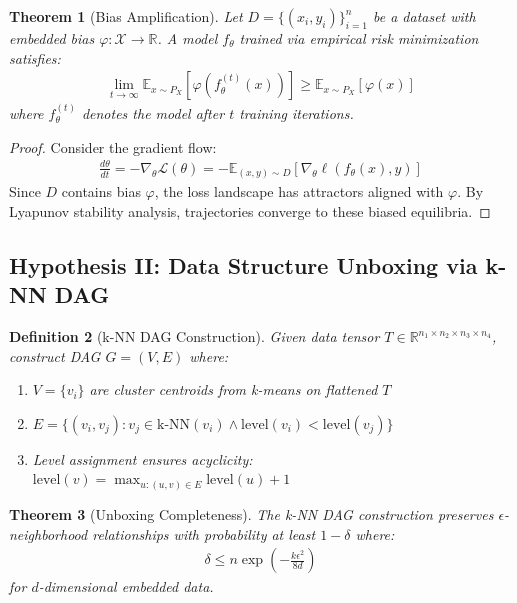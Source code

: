 \documentclass{article}
\newtheorem{theorem}{Theorem}
\newtheorem{definition}[theorem]{Definition}
\begin{document}
\begin{theorem}[Bias Amplification]
Let $D = \{(x_i, y_i)\}_{i=1}^n$ be a dataset with embedded bias $\varphi: \mathcal{X} \rightarrow \mathbb{R}$. A model $f_\theta$ trained via empirical risk minimization satisfies:
\begin{align}
\lim_{t \rightarrow \infty} \mathbb{E}_{x \sim P_X}[\varphi(f_\theta^{(t)}(x))] \geq \mathbb{E}_{x \sim P_X}[\varphi(x)]
\end{align}
where $f_\theta^{(t)}$ denotes the model after $t$ training iterations.
\end{theorem}

\begin{proof}
Consider the gradient flow:
\begin{align}
\frac{d\theta}{dt} = -\nabla_\theta \mathcal{L}(\theta) = -\mathbb{E}_{(x,y) \sim D}[\nabla_\theta \ell(f_\theta(x), y)]
\end{align}
Since $D$ contains bias $\varphi$, the loss landscape has attractors aligned with $\varphi$. By Lyapunov stability analysis, trajectories converge to these biased equilibria.
\end{proof}

\subsection{Hypothesis II: Data Structure Unboxing via k-NN DAG}

\begin{definition}[k-NN DAG Construction]
Given data tensor $T \in \mathbb{R}^{n_1 \times n_2 \times n_3 \times n_4}$, construct DAG $G = (V, E)$ where:
\begin{enumerate}
\item $V = \{v_i\}$ are cluster centroids from k-means on flattened $T$
\item $E = \{(v_i, v_j) : v_j \in \text{k-NN}(v_i) \land \text{level}(v_i) < \text{level}(v_j)\}$
\item Level assignment ensures acyclicity: $\text{level}(v) = \max_{u:(u,v) \in E} \text{level}(u) + 1$
\end{enumerate}
\end{definition}

\begin{theorem}[Unboxing Completeness]
The k-NN DAG construction preserves $\epsilon$-neighborhood relationships with probability at least $1 - \delta$ where:
\begin{align}
\delta \leq n \exp\left(-\frac{k\epsilon^2}{8d}\right)
\end{align}
for $d$-dimensional embedded data.
\end{theorem}
\end{document}
